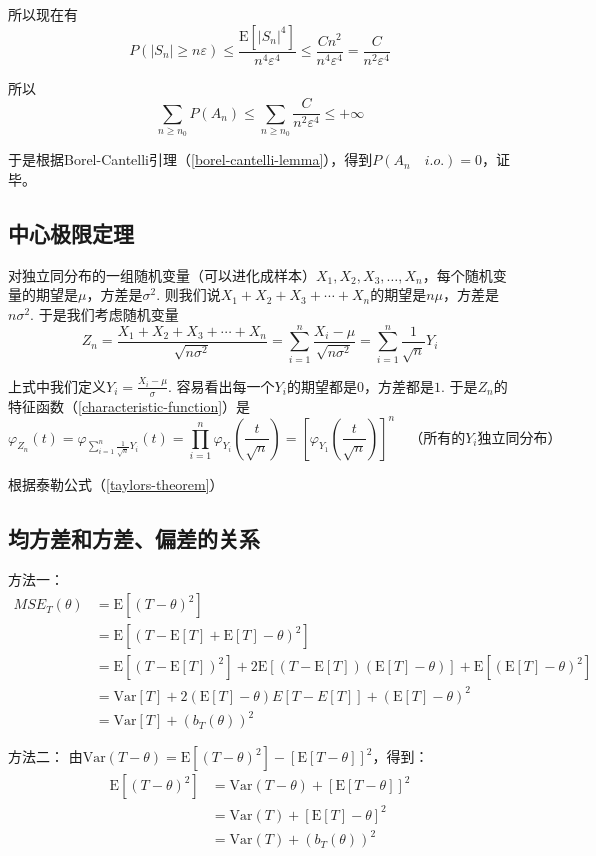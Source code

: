 \documentclass[UTF8]{ctexbook}
\begin{document}
所以现在有
\[
	P\left(|S_n|\geq n\varepsilon\right)\leq\frac{\mathrm E[|S_n|^4]}{n^4\varepsilon^4}\leq\frac{Cn^2}{n^4\varepsilon^4}=\frac{C}{n^2\varepsilon^4}
\]

所以
\[
	\sum_{n\geq n_0}P(A_n)\leq\sum_{n\geq n_0}\frac{C}{n^2\varepsilon^4}\leq+\infty
\]

于是根据Borel-Cantelli引理（\ref{borel-cantelli-lemma}），得到$P(A_n\quad i.o.)=0$，证毕。
\subsection{中心极限定理}
\label{CLT-proof}
对独立同分布的一组随机变量（可以进化成样本）$X_1,X_2,X_3,\dots,X_n$，每个随机变量的期望是$\mu$，方差是$\sigma^2$. 则我们说$X_1+X_2+X_3+\cdots+X_n$的期望是$n\mu$，方差是$n\sigma^2$. 于是我们考虑随机变量
\[
	Z_n=\frac{X_1+X_2+X_3+\cdots+X_n}{\sqrt{n\sigma^2}}=\sum_{i=1}^n\frac{X_i-\mu}{\sqrt{n\sigma^2}}=\sum_{i=1}^n\frac{1}{\sqrt n}Y_i
\]

上式中我们定义$Y_i=\frac{X_i-\mu}{\sigma}$. 容易看出每一个$Y_i$的期望都是$0$，方差都是$1$. 于是$Z_n$的特征函数（\ref{characteristic-function}）是
\[
	\varphi_{Z_n}(t)=\varphi_{\sum_{i=1}^n\frac{1}{\sqrt n}Y_i}(t)=\prod_{i=1}^n\varphi_{Y_i}\left(\frac{t}{\sqrt n}\right)=\left[\varphi_{Y_1}\left(\frac{t}{\sqrt n}\right)\right]^n\quad\text{（所有的$Y_i$独立同分布）}
\]

根据泰勒公式（\ref{taylors-theorem}）
\subsection{均方差和方差、偏差的关系}
\label{proof1}
方法一：
\begin{align*}
	MSE_T(\theta)&=\mathrm{E}[(T-\theta)^2] \\
	&=\mathrm{E}[(T-\mathrm{E}[T]+\mathrm{E}[T]-\theta)^2]\\
	&=\mathrm{E}[(T-\mathrm{E}[T])^2]+2\mathrm{E}[(T-\mathrm{E}[T])(\mathrm{E}[T]-\theta)]+\mathrm{E}[(\mathrm{E}[T]-\theta)^2]\\
	&=\mathrm{Var}[T]+2(\mathrm{E}[T]-\theta)E[T-E[T]]+(\mathrm{E}[T]-\theta)^2\\
	&=\mathrm{Var}[T]+(b_T(\theta))^2
\end{align*}

方法二：
由$\mathrm{Var}(T-\theta)=\mathrm{E}[(T-\theta)^2]-[\mathrm{E}[T-\theta]]^2$，得到：
\begin{align*}
	\mathrm{E}[(T-\theta)^2]&=\mathrm{Var}(T-\theta)+[\mathrm{E}[T-\theta]]^2\\
	&=\mathrm{Var}(T)+[\mathrm{E}[T]-\theta]^2\\
	&=\mathrm{Var}(T)+(b_T(\theta))^2
\end{align*}
\end{document}
